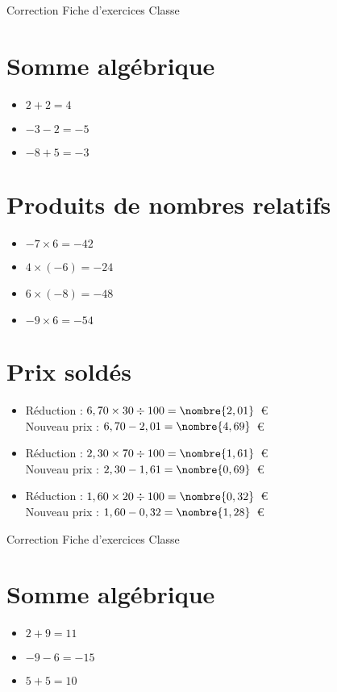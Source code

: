 \documentclass[a4paper,11pt,fleqn]{article}
\begin{document}
\pagestyle{empty}


{Correction} \hfill {\huge Fiche d'exercices } \hfill {Classe}

\section{Somme algébrique}
\begin{itemize}

  \item $2 +2=4$
  \item $-3 -2=-5$
  \item $-8 +5=-3$
\end{itemize}

\section{Produits de nombres relatifs}
\begin{itemize}

  \item $-7\times6=-42$
  \item $4\times(-6)=-24$
  \item $6\times(-8)=-48$
  \item $-9\times6=-54$
\end{itemize}

\section{Prix soldés}
\begin{itemize}

  \item Réduction : $6,70\times30\div100=\nombre{2,01}$~€\\
  Nouveau prix : $6,70-2,01=\nombre{4,69}$~€
  \item Réduction : $2,30\times70\div100=\nombre{1,61}$~€\\
  Nouveau prix : $2,30-1,61=\nombre{0,69}$~€
  \item Réduction : $1,60\times20\div100=\nombre{0,32}$~€\\
  Nouveau prix : $1,60-0,32=\nombre{1,28}$~€
\end{itemize}
\newpage
\setcounter{exo}{0}
\setcounter{section}{0}
{Correction} \hfill {\huge Fiche d'exercices } \hfill {Classe}

\section{Somme algébrique}
\begin{itemize}

  \item $2 +9=11$
  \item $-9 -6=-15$
  \item $5 +5=10$
\end{itemize}
\end{document}
